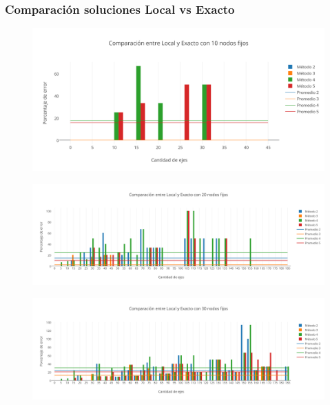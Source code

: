 \newpage
\subsubsection{Comparaci\'on soluciones Local vs Exacto}

  \begin{figure}[h!]
   \begin{center}
 	\includegraphics[scale=0.75]{imagenes/local/exacto/10nodos.png}
   \end{center}
 \end{figure}

  \begin{figure}[h!]
   \begin{center}
 	\includegraphics[scale=0.55]{imagenes/local/exacto/20nodos.png}
   \end{center}
 \end{figure}
 
   \begin{figure}[h!]
   \begin{center}
 	\includegraphics[scale=0.55]{imagenes/local/exacto/30nodos.png}
   \end{center}
 \end{figure}

